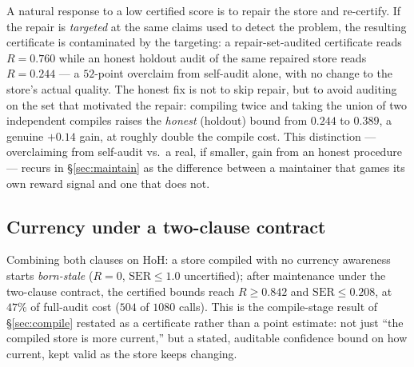 A natural response to a low certified score is to repair the store and re-certify. If the repair is \emph{targeted} at the same claims used to detect the problem, the resulting certificate is contaminated by the targeting: a repair-set-audited certificate reads $R = 0.760$ while an honest holdout audit of the same repaired store reads $R = 0.244$ --- a $52$-point overclaim from self-audit alone, with no change to the store's actual quality. The honest fix is not to skip repair, but to avoid auditing on the set that motivated the repair: compiling twice and taking the union of two independent compiles raises the \emph{honest} (holdout) bound from $0.244$ to $0.389$, a genuine $+0.14$ gain, at roughly double the compile cost. This distinction --- overclaiming from self-audit vs.\ a real, if smaller, gain from an honest procedure --- recurs in \S\ref{sec:maintain} as the difference between a maintainer that games its own reward signal and one that does not.

\subsection{Currency under a two-clause contract}
\label{sec:certify-currency}

Combining both clauses on HoH: a store compiled with no currency awareness starts \emph{born-stale} ($R{=}0$, $\mathrm{SER} \le 1.0$ uncertified); after maintenance under the two-clause contract, the certified bounds reach $R \ge 0.842$ and $\mathrm{SER} \le 0.208$, at $47\%$ of full-audit cost ($504$ of $1080$ calls). This is the compile-stage result of \S\ref{sec:compile} restated as a certificate rather than a point estimate: not just ``the compiled store is more current,'' but a stated, auditable confidence bound on how current, kept valid as the store keeps changing.
